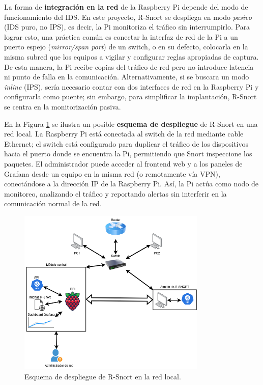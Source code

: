 \documentclass[11pt,a4paper,twoside]{report}
\begin{document}
La forma de \textbf{integración en la red} de la Raspberry Pi depende del modo de funcionamiento del IDS. En este proyecto, R-Snort se despliega en modo \emph{pasivo} (IDS puro, no IPS), es decir, la Pi monitoriza el tráfico sin interrumpirlo. Para lograr esto, una práctica común es conectar la interfaz de red de la Pi a un puerto espejo (\emph{mirror/span port}) de un switch, o en su defecto, colocarla en la misma subred que los equipos a vigilar y configurar reglas apropiadas de captura. De esta manera, la Pi recibe copias del tráfico de red pero no introduce latencia ni punto de falla en la comunicación. Alternativamente, si se buscara un modo \emph{inline} (IPS), sería necesario contar con dos interfaces de red en la Raspberry Pi y configurarla como puente; sin embargo, para simplificar la implantación, R-Snort se centra en la monitorización pasiva.\newline

En la Figura \ref{fig:despliegue} se ilustra un posible \textbf{esquema de despliegue} de R-Snort en una red local. La Raspberry Pi está conectada al switch de la red mediante cable Ethernet; el switch está configurado para duplicar el tráfico de los dispositivos hacia el puerto donde se encuentra la Pi, permitiendo que Snort inspeccione los paquetes. El administrador puede acceder al frontend web y a los paneles de Grafana desde un equipo en la misma red (o remotamente vía VPN), conectándose a la dirección IP de la Raspberry Pi. Así, la Pi actúa como nodo de monitoreo, analizando el tráfico y reportando alertas sin interferir en la comunicación normal de la red.\newline

\begin{figure}[hbtp]
	\centering
	\includegraphics[width=0.8\textwidth]{documento/4.png}
	\caption{Esquema de despliegue de R-Snort en la red local.}
	\label{fig:despliegue}
\end{figure}
\end{document}
